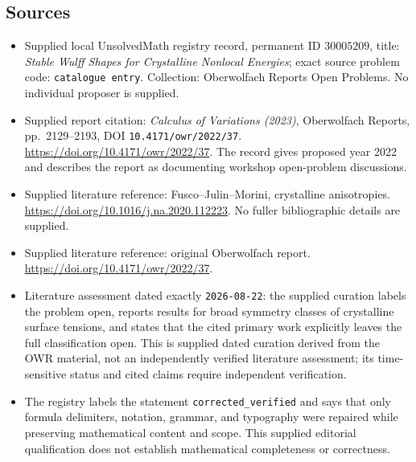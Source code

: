 \documentclass[11pt]{article}
\begin{document}
\subsection{Sources}
\begin{itemize}
\item Supplied local UnsolvedMath registry record, permanent ID \(30005209\), title: \emph{Stable Wulff Shapes for Crystalline Nonlocal Energies}; exact source problem code: \texttt{catalogue entry}. Collection: Oberwolfach Reports Open Problems. No individual proposer is supplied.
\item Supplied report citation: \emph{Calculus of Variations (2023)}, Oberwolfach Reports, pp.~2129--2193, DOI \texttt{10.4171/owr/2022/37}. \url{https://doi.org/10.4171/owr/2022/37}. The record gives proposed year 2022 and describes the report as documenting workshop open-problem discussions.
\item Supplied literature reference: Fusco--Julin--Morini, crystalline anisotropies. \url{https://doi.org/10.1016/j.na.2020.112223}. No fuller bibliographic details are supplied.
\item Supplied literature reference: original Oberwolfach report. \url{https://doi.org/10.4171/owr/2022/37}.
\item Literature assessment dated exactly \texttt{2026-08-22}: the supplied curation labels the problem open, reports results for broad symmetry classes of crystalline surface tensions, and states that the cited primary work explicitly leaves the full classification open. This is supplied dated curation derived from the OWR material, not an independently verified literature assessment; its time-sensitive status and cited claims require independent verification.
\item The registry labels the statement \texttt{corrected\_verified} and says that only formula delimiters, notation, grammar, and typography were repaired while preserving mathematical content and scope. This supplied editorial qualification does not establish mathematical completeness or correctness.
\end{itemize}
\end{document}
